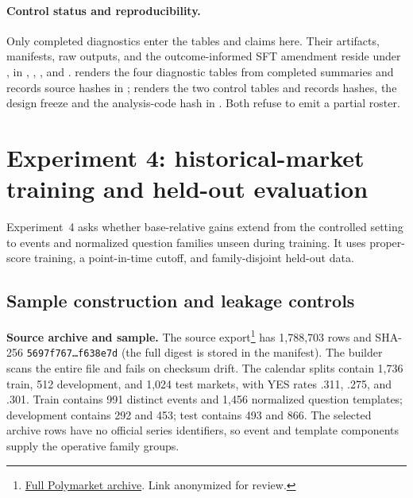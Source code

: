 \paragraph{Control status and reproducibility.}
Only completed diagnostics enter the tables and claims here. Their artifacts,
manifests, raw
outputs, and the outcome-informed SFT amendment reside under
, in
, , , and
.
 renders the four diagnostic
tables from completed summaries and records source hashes in
;
 renders the two control
tables and records hashes, the design freeze and the analysis-code hash in
. Both refuse to emit a
partial roster.

\section{Experiment 4: historical-market training and held-out evaluation}
\label{app:exp4}
\label{app:exp3b-protocol}

Experiment~4 asks whether base-relative gains extend from the controlled setting
to events and normalized question families unseen during training. It uses
proper-score training, a point-in-time cutoff, and family-disjoint held-out data.

\subsection{Sample construction and leakage controls}

\noindent\textbf{Source archive and sample.}
The source export\footnote{%
  \;%
  \href{https://huggingface.co/datasets/anonymous-review/polymarket-full-market-data}%
  {Full Polymarket archive}. Link anonymized for review.%
} has 1,788,703 rows and SHA-256
\texttt{5697f767\ldots f638e7d} (the full digest is stored in the manifest).
The builder scans the entire file and fails on checksum drift. The calendar
splits contain 1,736 train, 512 development, and 1,024 test markets, with YES rates
.311, .275, and .301. Train contains 991 distinct events and 1,456 normalized
question templates; development contains 292 and 453; test contains 493 and 866.
The selected archive rows have no official series identifiers, so event and
template components supply the operative family groups.

